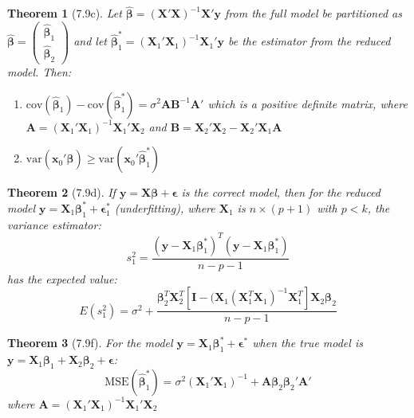 \documentclass{article}
\newtheorem{theorem}{Theorem}[section]
\begin{document}
\begin{theorem}[7.9c]
Let $\hat{\boldsymbol{\beta}} = (\mathbf{X}'\mathbf{X})^{-1}\mathbf{X}'\mathbf{y}$ from the full model be partitioned as $\hat{\boldsymbol{\beta}} = \begin{pmatrix} \hat{\boldsymbol{\beta}}_1 \\ \hat{\boldsymbol{\beta}}_2 \end{pmatrix}$ and let $\hat{\boldsymbol{\beta}}_1^* = (\mathbf{X}_1'\mathbf{X}_1)^{-1}\mathbf{X}_1'\mathbf{y}$ be the estimator from the reduced model. Then:
\begin{enumerate}[label=(\roman*)]
\item $\text{cov}(\hat{\boldsymbol{\beta}}_1) - \text{cov}(\hat{\boldsymbol{\beta}}_1^*) = \sigma^2\mathbf{A}\mathbf{B}^{-1}\mathbf{A}'$ which is a positive definite matrix, where $\mathbf{A} = (\mathbf{X}_1'\mathbf{X}_1)^{-1}\mathbf{X}_1'\mathbf{X}_2$ and $\mathbf{B} = \mathbf{X}_2'\mathbf{X}_2 - \mathbf{X}_2'\mathbf{X}_1\mathbf{A}$
\item $\text{var}(\mathbf{x}_0'\hat{\boldsymbol{\beta}}) \geq \text{var}(\mathbf{x}_0'\hat{\boldsymbol{\beta}}_1^*)$
\end{enumerate}
\end{theorem}

\begin{theorem}[7.9d]
If $\mathbf{y} = \mathbf{X}\boldsymbol{\beta} + \boldsymbol{\epsilon}$ is the correct model, then for the reduced model $\mathbf{y} = \mathbf{X}_1\boldsymbol{\beta}_1^* + \boldsymbol{\epsilon}_1^*$ (underfitting), where $\mathbf{X}_1$ is $n \times (p + 1)$ with $p < k$, the variance estimator:
\[s_1^2 = \frac{(\mathbf{y}-\mathbf{X}_1\boldsymbol{\beta}_1^*)^T(\mathbf{y}-\mathbf{X}_1\boldsymbol{\beta}_1^*)}{n-p-1}\]
has the expected value:
\[E(s_1^2) = \sigma^2 + \frac{\boldsymbol{\beta}_2^T\mathbf{X}_2^T[\mathbf{I}-(\mathbf{X}_1(\mathbf{X}_1^T\mathbf{X}_1)^{-1}\mathbf{X}_1^T]\mathbf{X}_2\boldsymbol{\beta}_2}{n-p-1}\]
\end{theorem}

\begin{theorem}[7.9f]
For the model $\mathbf{y} = \mathbf{X}_1\boldsymbol{\beta}_1^* + \boldsymbol{\epsilon}^*$ when the true model is $\mathbf{y} = \mathbf{X}_1\boldsymbol{\beta}_1 + \mathbf{X}_2\boldsymbol{\beta}_2 + \boldsymbol{\epsilon}$:
\[\text{MSE}(\hat{\boldsymbol{\beta}}_1^*) = \sigma^2(\mathbf{X}_1'\mathbf{X}_1)^{-1} + \mathbf{A}\boldsymbol{\beta}_2\boldsymbol{\beta}_2'\mathbf{A}'\]
where $\mathbf{A} = (\mathbf{X}_1'\mathbf{X}_1)^{-1}\mathbf{X}_1'\mathbf{X}_2$
\end{theorem}
\end{document}
